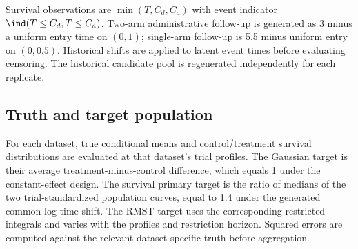 Survival observations are $\min(T,C_d,C_a)$ with event indicator $\ind(T\leq C_d,T\leq C_a)$. Two-arm administrative follow-up is generated as 3 minus a uniform entry time on $(0,1)$; single-arm follow-up is 5.5 minus uniform entry on $(0,0.5)$. Historical shifts are applied to latent event times before evaluating censoring. The historical candidate pool is regenerated independently for each replicate.

\subsection{Truth and target population}\label{sec:E.3}
For each dataset, true conditional means and control/treatment survival distributions are evaluated at that dataset's trial profiles. The Gaussian target is their average treatment-minus-control difference, which equals 1 under the constant-effect design. The survival primary target is the ratio of medians of the two trial-standardized population curves, equal to 1.4 under the generated common log-time shift. The RMST target uses the corresponding restricted integrals and varies with the profiles and restriction horizon. Squared errors are computed against the relevant dataset-specific truth before aggregation.

